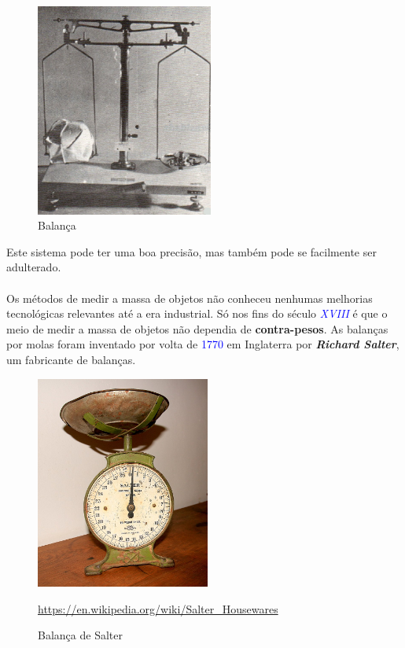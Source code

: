 \hspace{2.2cm}
\begin{minipage}[!b]{0.45\linewidth}
	\begin{figure}[H]
		\centering
		\includegraphics[height=7cm]{./image/PESTA/general/balanca_4.jpg}
		\caption{Balança}
		\label{balanca_4}
	\end{figure}
\end{minipage}
\newline
\newline
\newline
Este sistema pode ter uma boa precisão, mas também pode se facilmente ser adulterado.
\\
\\
Os métodos de medir a massa de objetos não conheceu nenhumas melhorias tecnológicas relevantes até a era industrial. Só nos fins do século \textcolor{blue}{\textit{XVIII}} é que o meio de medir a massa de objetos não dependia de \textbf{contra-pesos}. As balanças por molas foram inventado por volta de \textcolor{blue}{1770} em Inglaterra por \textbf{\textit{Richard Salter}}, um fabricante de balanças.
\\
\begin{figure}[H]
	\centering
	\includegraphics[height=7cm]{./image/PESTA/general/Weigh_Scale_Salter_1.jpg}
	\caption{Balança de Salter}
	\url{https://en.wikipedia.org/wiki/Salter_Housewares}
	\label{Weigh_Scale_Salter_1}
\end{figure}
